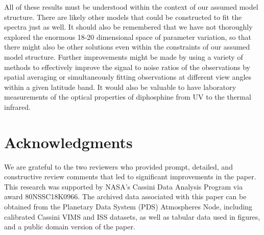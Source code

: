 \documentclass[article,11pt]{emulateapj}
\begin{document}
All of these results must be understood within the context of our assumed model
structure. There are likely other models that could be constructed to fit the spectra
just as well. It should also be remembered that we have not thoroughly explored the
enormous 18-20 dimensional space of parameter variation, so that there might also
be other solutions even within the constraints of our assumed model structure. Further
improvements might be made by using a variety of methods to effectively improve
the signal to noise ratios of the observations by spatial averaging or simultaneously
fitting observations at different view angles within a given latitude band. It would
also be valuable to have laboratory measurements of the optical properties of diphosphine
from UV to the thermal infrared. 

\section{Acknowledgments}

We are grateful to the two reviewers who provided prompt,  detailed,
and constructive review comments that led to significant improvements in the paper.  This
research was supported by NASA's Cassini Data Analysis Program via
award 80NSSC18K0966.  The archived data associated with this paper can be obtained
from the Planetary Data System (PDS) Atmospheres Node, including calibrated Cassini VIMS
and ISS datasets, as well as tabular data used in figures, and a public domain version
of the paper.



\end{document}
